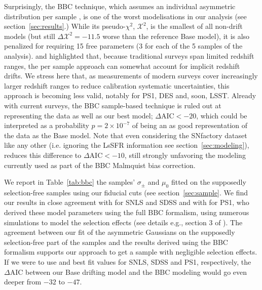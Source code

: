 \documentclass[]{aa} %
\begin{document}
Surprisingly, the BBC technique, which assumes an individual asymmetric
distribution per sample \citep{scolnic2016,kessler2017}, is one of the worst
modelisations in our analysis (see section~\ref{sec:results}.) While its
pseudo-$\chi^{2}$, $\mathcal{X}^2$, is the smallest of all non-drift models (but
still $\Delta \mathcal{X}^2=-11.5$ worse than the reference Base model), it is
also penalized for requiring 15 free parameters (3 for each of the 5 samples of
the analysis). \citet[][section~2]{scolnic2016} and
\citet[][section~5.4]{scolnic2018a} highlighted that, because traditional
surveys span limited redshift ranges, the per sample approach can somewhat
account for implicit redshift drifts. We stress here that, as measurements of
modern surveys cover increasingly larger redshift ranges to reduce calibration
systematic uncertainties, this approach is becoming less valid, notably for PS1,
DES and, soon, LSST. Already with current surveys, the BBC sample-based
technique is ruled out at representing the data as well as our best model;
$\Delta\mathrm{AIC}<-20$, which could be interpreted as a probability $p=2\times
10^{-7}$ of being an as good representation of the data as the Base model. Note
that even considering the SNfactory dataset like any other (i.e.  ignoring the
LsSFR information see section~\ref{sec:modeling}), reduces this difference to
$\Delta\mathrm{AIC}<-10$, still strongly unfavoring the modeling currently used
as part of the BBC Malmquist bias correction.
    
We report in Table~\ref{tab:bbc} the samples' $\sigma_{\pm}$ and $\mu_0$ fitted
on the supposedly selection-free samples using our fiducial cuts (see
section~\ref{sec:sample}. We find our results in close agreement with
\cite{scolnic2016} for SNLS and SDSS and with \cite{scolnic2018a} for PS1, who
derived these model parameters using the full BBC formalism, using numerous
simulations to model the selection effects (see details e.g., section 3 of
\citealt{kessler2017}). The agreement between our fit of the asymmetric
Gaussians on the supposedly selection-free part of the samples and the results
derived using the BBC formalism supports our approach to get a sample with
negligible selection effects. If we were to use \cite{scolnic2016} and
\cite{scolnic2018a} best fit values for SNLS, SDSS and PS1, respectively, the
$\Delta\mathrm{AIC}$ between our Base drifting model and the BBC modeling would
go even deeper from $-32$ to $-47$.  
    
\end{document}
